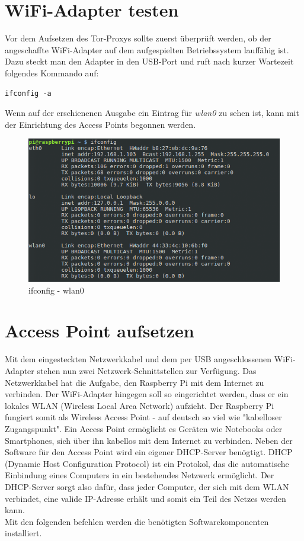 \section{WiFi-Adapter testen}
Vor dem Aufsetzen des Tor-Proxys sollte zuerst überprüft werden, ob der angeschaffte WiFi-Adapter auf dem aufgespielten Betriebssystem lauffähig ist. Dazu steckt man den Adapter in den USB-Port und ruft nach kurzer Wartezeit folgendes Kommando auf:

\begin{lstlisting}
ifconfig -a
\end{lstlisting}

Wenn auf der erschienenen Ausgabe ein Eintrag für \textit{wlan0} zu sehen ist, kann mit der Einrichtung des Access Points begonnen werden.

\begin{figure}[h]
\centering
\includegraphics[scale=0.7]{images/ifconfig}
\caption{ifconfig - wlan0}
\end{figure}

\section{Access Point aufsetzen}
Mit dem eingesteckten Netzwerkkabel und dem per USB angeschlossenen WiFi-Adapter stehen nun zwei Netzwerk-Schnittstellen zur Verfügung. Das Netzwerkkabel hat die Aufgabe, den Raspberry Pi mit dem Internet zu verbinden. Der WiFi-Adapter hingegen soll so eingerichtet werden, dass er ein lokales WLAN (Wireless Local Area Network) aufzieht. Der Raspberry Pi fungiert somit als Wireless Access Point - auf deutsch so viel wie "kabelloser Zugangspunkt". Ein Access Point ermöglicht es Geräten wie Notebooks oder Smartphones, sich über ihn kabellos mit dem Internet zu verbinden. Neben der Software für den Access Point wird ein eigener DHCP-Server benögtigt. DHCP (Dynamic Host Configuration Protocol) ist ein Protokol, das die automatische Einbindung eines Computers in ein bestehendes Netzwerk ermöglicht. Der DHCP-Server sorgt also dafür, dass jeder Computer, der sich mit dem WLAN verbindet, eine valide IP-Adresse erhält und somit ein Teil des Netzes werden kann.
\\
Mit den folgenden befehlen werden die benötigten Softwarekomponenten installiert.
 
